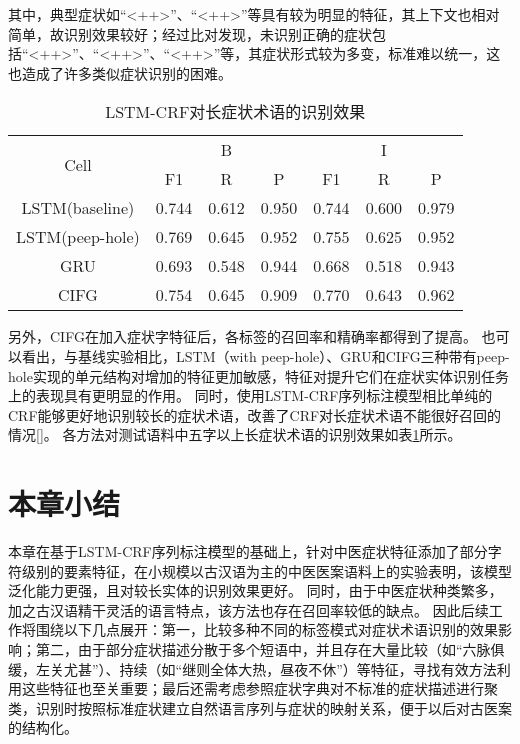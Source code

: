其中，典型症状如“<++>”、“<++>”等具有较为明显的特征，其上下文也相对简单，故识别效果较好；经过比对发现，未识别正确的症状包括“<++>”、“<++>”、“<++>”等，其症状形式较为多变，标准难以统一，这也造成了许多类似症状识别的困难。

\begin{table}[H]
    \centering
    \begin{tabular}{ccccccc}
        \toprule
            \multirow{2}{*}{Cell} & \multicolumn{3}{c}{B} & \multicolumn{3}{c}{I}\\
            \cmidrule(lr){2-4} \cmidrule(lr){5-7}
            & F1 & R & P & F1 & R & P\\
        \midrule
        {LSTM}{(baseline)} & 0.744&0.612&0.950&0.744&0.600&0.979\\
        {LSTM}{(peep-hole)} & 0.769&0.645&0.952&0.755&0.625&0.952\\
        {GRU} & 0.693&0.548&0.944&0.668&0.518&0.943\\
        {CIFG} & 0.754&0.645&0.909&0.770&0.643&0.962\\
        \bottomrule
    \end{tabular}
    \caption{LSTM-CRF对长症状术语的识别效果}
    \label{tab:tab2}
\end{table}
另外，CIFG在加入症状字特征后，各标签的召回率和精确率都得到了提高。
也可以看出，与基线实验相比，LSTM（with peep-hole）、GRU和CIFG三种带有peep-hole实现的单元结构对增加的特征更加敏感，特征对提升它们在症状实体识别任务上的表现具有更明显的作用。
同时，使用LSTM-CRF序列标注模型相比单纯的CRF能够更好地识别较长的症状术语，改善了CRF对长症状术语不能很好召回的情况[]。
各方法对测试语料中五字以上长症状术语的识别效果如表\ref{tab:tab2}所示。

\section{本章小结}
本章在基于LSTM-CRF序列标注模型的基础上，针对中医症状特征添加了部分字符级别的要素特征，在小规模以古汉语为主的中医医案语料上的实验表明，该模型泛化能力更强，且对较长实体的识别效果更好。
同时，由于中医症状种类繁多，加之古汉语精干灵活的语言特点，该方法也存在召回率较低的缺点。
因此后续工作将围绕以下几点展开：第一，比较多种不同的标签模式对症状术语识别的效果影响；第二，由于部分症状描述分散于多个短语中，并且存在大量比较（如“六脉俱缓，左关尤甚”）、持续（如“继则全体大热，昼夜不休”）等特征，寻找有效方法利用这些特征也至关重要；最后还需考虑参照症状字典对不标准的症状描述进行聚类，识别时按照标准症状建立自然语言序列与症状的映射关系，便于以后对古医案的结构化。



